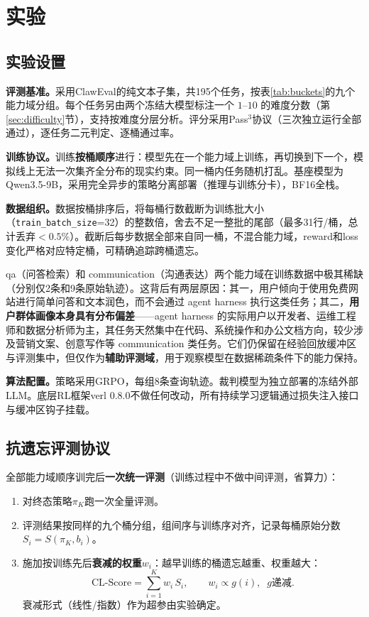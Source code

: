 \section{实验}
\label{sec:experiments}

\subsection{实验设置}

\textbf{评测基准。}采用ClawEval的纯文本子集，共195个任务，按表\ref{tab:buckets}的九个能力域分组。每个任务另由两个冻结大模型标注一个 $1$--$10$ 的难度分数（第\ref{sec:difficulty}节），支持按难度分层分析。评分采用Pass$^3$协议（三次独立运行全部通过），逐任务二元判定、逐桶通过率。

\textbf{训练协议。}训练\textbf{按桶顺序}进行：模型先在一个能力域上训练，再切换到下一个，模拟线上无法一次集齐全分布的现实约束。同一桶内任务随机打乱。基座模型为Qwen3.5-9B，采用完全异步的策略分离部署（推理与训练分卡），BF16全栈。

\textbf{数据组织。}数据按桶排序后，将每桶行数截断为训练批大小（\texttt{train\_batch\_size}=32）的整数倍，舍去不足一整批的尾部（最多31行/桶，总计丢弃$<0.5\%$）。截断后每步数据全部来自同一桶，不混合能力域，reward和loss变化严格对应特定桶，可精确追踪跨桶遗忘。

qa（问答检索）和 communication（沟通表达）两个能力域在训练数据中极其稀缺（分别仅2条和9条原始轨迹）。这背后有两层原因：其一，用户倾向于使用免费网站进行简单问答和文本润色，而不会通过 agent harness 执行这类任务；其二，\textbf{用户群体画像本身具有分布偏差}——agent harness 的实际用户以开发者、运维工程师和数据分析师为主，其任务天然集中在代码、系统操作和办公文档方向，较少涉及营销文案、创意写作等 communication 类任务。它们仍保留在经验回放缓冲区与评测集中，但仅作为\textbf{辅助评测域}，用于观察模型在数据稀疏条件下的能力保持。

\textbf{算法配置。}策略采用GRPO，每组8条查询轨迹。裁判模型为独立部署的冻结外部LLM。底层RL框架verl 0.8.0不做任何改动，所有持续学习逻辑通过损失注入接口与缓冲区钩子挂载。

\subsection{抗遗忘评测协议}

全部能力域顺序训完后\textbf{一次统一评测}（训练过程中不做中间评测，省算力）：

\begin{enumerate}
  \item 对终态策略$\pi_K$跑一次全量评测。
  \item 评测结果按同样的九个桶分组，组间序与训练序对齐，记录每桶原始分数$S_i = S(\pi_K, b_i)$。
  \item 施加按训练先后\textbf{衰减的权重}$w_i$：越早训练的桶遗忘越重、权重越大：
  \begin{equation}
    \text{CL-Score} = \sum_{i=1}^{K} w_i\,S_i,\qquad w_i \propto g(i),\;\;g\text{递减}.
  \end{equation}
  衰减形式（线性/指数）作为超参由实验确定。
\end{enumerate}

